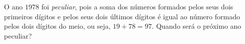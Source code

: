 O ano $1978$ foi \emph{peculiar}, pois a soma dos números formados pelos seus dois primeiros dígitos e pelos seus dois últimos dígitos é igual ao número formado pelos dois dígitos do meio, ou seja, $19 + 78 = 97$. Quando será o próximo ano peculiar?
